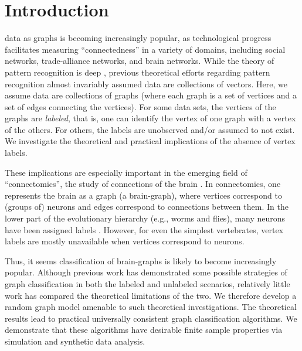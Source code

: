 \maketitle
\IEEEdisplaynotcompsoctitleabstractindextext
\IEEEpeerreviewmaketitle



\section{Introduction} \label{sec:1}

 data as graphs is becoming increasingly popular, as technological progress facilitates measuring ``connectedness'' in a variety of domains, including social networks, trade-alliance networks, and brain networks.  While the theory of pattern recognition is deep \cite{Devroye1996}, previous theoretical efforts regarding pattern recognition almost invariably assumed data are collections of vectors.  Here, we assume data are collections of graphs (where each graph is a set of vertices and a set of edges connecting the vertices).  For some data sets, the vertices of the graphs are \emph{labeled}, that is, one can identify the vertex of one graph with a vertex of the others.  For others, the labels are unobserved and/or assumed to not exist.  We investigate the theoretical and practical implications of the absence of vertex labels.  

These implications are especially important in the emerging field of ``connectomics'', the study of connections of the brain \cite{Hagmann05, Sporns2010}.  In connectomics, one represents the brain as a graph (a brain-graph), where vertices correspond to (groups of) neurons and edges correspond to connections between them.  In the lower part of the evolutionary hierarchy (e.g., worms and flies), many neurons have been assigned labels \cite{WhiteBrenner86}.  However, for even the simplest vertebrates, vertex labels are mostly unavailable when vertices correspond to neurons.  

Thus, it seems classification of brain-graphs is likely to become increasingly popular.  Although previous work has demonstrated some possible strategies of graph classification in both the labeled \cite{VP11_sigsub} and unlabeled \cite{Duin2011} scenarios, relatively little work has compared the theoretical limitations of the two.  We therefore develop a random graph model amenable to such theoretical investigations.  The theoretical results lead to practical universally consistent graph classification algorithms.  We demonstrate that these algorithms have desirable finite sample properties via simulation and synthetic data analysis.



